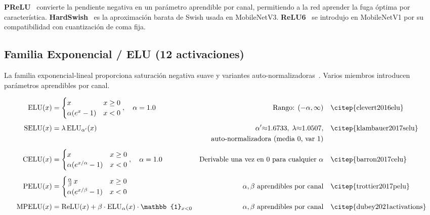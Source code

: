 \noindent\textbf{PReLU}~\citep{he2015prelu} convierte la pendiente negativa en
un parámetro aprendible por canal, permitiendo a la red aprender la fuga
óptima por característica. \textbf{HardSwish}~\citep{howard2019hardswish} es
la aproximación barata de Swish usada en MobileNetV3.
\textbf{ReLU6}~\citep{howard2017mobile} se introdujo en MobileNetV1 por su
compatibilidad con cuantización de coma fija.

\subsection{Familia Exponencial / ELU (12 activaciones)}

La familia exponencial-lineal proporciona saturación negativa suave y
variantes auto-normalizadoras~\citep{clevert2016elu,klambauer2017selu,dubey2021activations}.
Varios miembros introducen parámetros aprendibles por canal.

\begin{align}
  \text{ELU}(x) &= \begin{cases} x & x\ge 0 \\ \alpha(e^{x}-1) & x<0 \end{cases},
    \quad \alpha=1.0
    & \text{Rango: } (-\alpha,\infty)
    & \quad \text{\citep{clevert2016elu}} \\[4pt]
  \text{SELU}(x) &= \lambda\,\text{ELU}_{\alpha'}(x)
    & \alpha'{\approx}1.6733,\;\lambda{\approx}1.0507,
    & \quad \text{\citep{klambauer2017selu}} \\
  & & \text{auto-normalizadora (media 0, var 1)} & \notag \\[4pt]
  \text{CELU}(x) &= \begin{cases} x & x\ge 0 \\ \alpha(e^{x/\alpha}-1) & x<0 \end{cases},
    \quad \alpha=1.0
    & \text{Derivable una vez en 0 para cualquier } \alpha
    & \quad \text{\citep{barron2017celu}} \\[4pt]
  \text{PELU}(x) &= \begin{cases} \tfrac{\alpha}{\beta}\,x & x\ge 0 \\
    \alpha(e^{x/\beta}-1) & x<0 \end{cases}
    & \alpha,\beta\text{ aprendibles por canal}
    & \quad \text{\citep{trottier2017pelu}} \\[4pt]
  \text{MPELU}(x) &= \text{ReLU}(x)+\beta\cdot\text{ELU}_{\alpha}(x)\cdot\mathbb{1}_{x<0}
    & \alpha,\beta\text{ aprendibles por canal}
    & \quad \text{\citep{dubey2021activations}}
\end{align}

